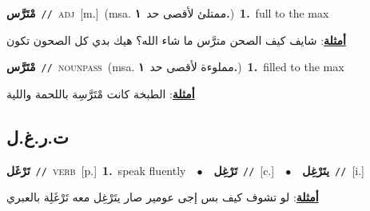 \documentclass[10pt,a4paper,twoside]{article} %
\begin{document}
\begin{multicols}{2}
{\setlength\topsep{0pt}\textbf{\foreignlanguage{arabic}{مْتَرَّس}}\ {\color{gray}\texttt{//}\color{black}}\ \textsc{adj}\ [m.]\ \color{gray}(msa. \foreignlanguage{arabic}{ممتلئ لأقصى حد}~\foreignlanguage{arabic}{\textbf{١.}})\color{black}\ \textbf{1.}~full to the max\  \begin{flushright}\color{gray}\foreignlanguage{arabic}{\textbf{\underline{\foreignlanguage{arabic}{أمثلة}}}: شايف كيف الصحن مترَّس ما شاء الله؟ هيك بدي كل الصحون تكون}\end{flushright}\color{black}} \vspace{2mm}

{\setlength\topsep{0pt}\textbf{\foreignlanguage{arabic}{مْتَرَّس}}\ {\color{gray}\texttt{//}\color{black}}\ \textsc{noun\textunderscore pass}\ \color{gray}(msa. \foreignlanguage{arabic}{مملوءة لأقصى حد}~\foreignlanguage{arabic}{\textbf{١.}})\color{black}\ \textbf{1.}~filled to the max\  \begin{flushright}\color{gray}\foreignlanguage{arabic}{\textbf{\underline{\foreignlanguage{arabic}{أمثلة}}}: الطبخة كانت مْتَرَّسِة باللحمة واللية}\end{flushright}\color{black}} \vspace{2mm}

\vspace{-3mm}
\subsection*{\color{blue}\foreignlanguage{arabic}{ت.ر.غ.ل}\color{blue}{}} 

{\setlength\topsep{0pt}\textbf{\foreignlanguage{arabic}{تَرْغَل}}\ {\color{gray}\texttt{//}\color{black}}\ \textsc{verb}\ [p.]\ \textbf{1.}~speak fluently\ \ $\bullet$\ \ \setlength\topsep{0pt}\textbf{\foreignlanguage{arabic}{تَرْغِل}}\ {\color{gray}\texttt{//}\color{black}}\ [c.]\ \ $\bullet$\ \ \setlength\topsep{0pt}\textbf{\foreignlanguage{arabic}{يتَرْغِل}}\ {\color{gray}\texttt{//}\color{black}}\ [i.]\  \begin{flushright}\color{gray}\foreignlanguage{arabic}{\textbf{\underline{\foreignlanguage{arabic}{أمثلة}}}: لو تشوف كيف بس إجى عومير صار يتَرْغِل معه تَرْغَلِة بالعبري}\end{flushright}\color{black}} \vspace{2mm}


\end{multicols}
\end{document}
